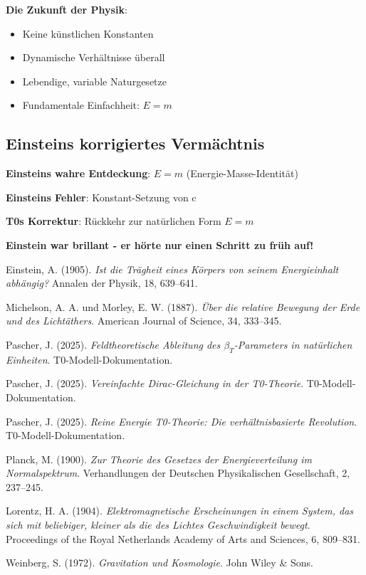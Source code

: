 \documentclass[12pt,a4paper]{article}
\begin{document}
	\textbf{Die Zukunft der Physik}:
	\begin{itemize}
		\item Keine künstlichen Konstanten
		\item Dynamische Verhältnisse überall
		\item Lebendige, variable Naturgesetze
		\item Fundamentale Einfachheit: $E = m$
	\end{itemize}
	
	\subsection{Einsteins korrigiertes Vermächtnis}
	
	\textbf{Einsteins wahre Entdeckung}: $E = m$ (Energie-Masse-Identität)
	
	\textbf{Einsteins Fehler}: Konstant-Setzung von c
	
	\textbf{T0s Korrektur}: Rückkehr zur natürlichen Form $E = m$
	
	\textbf{Einstein war brillant - er hörte nur einen Schritt zu früh auf!}
	
	\begin{thebibliography}{99}
		Einstein, A. (1905). \textit{Ist die Trägheit eines Körpers von seinem Energieinhalt abhängig?} Annalen der Physik, 18, 639--641.
		
		Michelson, A. A. und Morley, E. W. (1887). \textit{Über die relative Bewegung der Erde und des Lichtäthers}. American Journal of Science, 34, 333--345.
		
		Pascher, J. (2025). \textit{Feldtheoretische Ableitung des $\beta_T$-Parameters in natürlichen Einheiten}. T0-Modell-Dokumentation.
		
		Pascher, J. (2025). \textit{Vereinfachte Dirac-Gleichung in der T0-Theorie}. T0-Modell-Dokumentation.
		
		Pascher, J. (2025). \textit{Reine Energie T0-Theorie: Die verhältnisbasierte Revolution}. T0-Modell-Dokumentation.
		
		Planck, M. (1900). \textit{Zur Theorie des Gesetzes der Energieverteilung im Normalspektrum}. Verhandlungen der Deutschen Physikalischen Gesellschaft, 2, 237--245.
		
		Lorentz, H. A. (1904). \textit{Elektromagnetische Erscheinungen in einem System, das sich mit beliebiger, kleiner als die des Lichtes Geschwindigkeit bewegt}. Proceedings of the Royal Netherlands Academy of Arts and Sciences, 6, 809--831.
		
		Weinberg, S. (1972). \textit{Gravitation und Kosmologie}. John Wiley \& Sons.
	\end{thebibliography}
	
\end{document}
